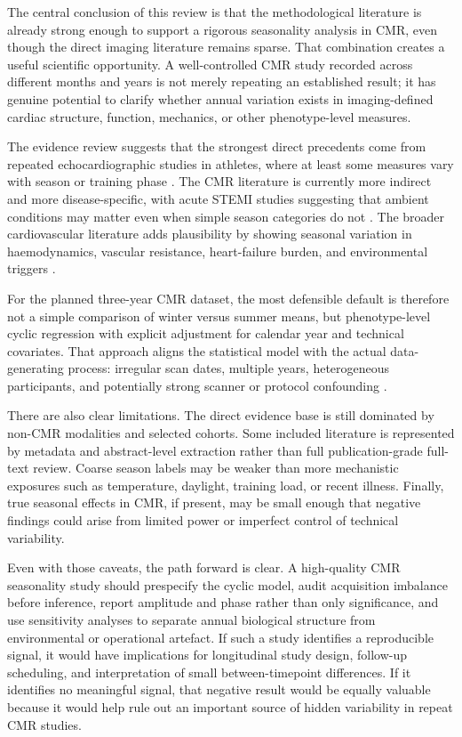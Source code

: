The central conclusion of this review is that the methodological literature is already strong enough to support a rigorous seasonality analysis in CMR, even though the direct imaging literature remains sparse. That combination creates a useful scientific opportunity. A well-controlled CMR study recorded across different months and years is not merely repeating an established result; it has genuine potential to clarify whether annual variation exists in imaging-defined cardiac structure, function, mechanics, or other phenotype-level measures.

The evidence review suggests that the strongest direct precedents come from repeated echocardiographic studies in athletes, where at least some measures vary with season or training phase \cite{Fagard1983,Crouse1992,Dernovoj2022,Forsythe2023}. The CMR literature is currently more indirect and more disease-specific, with acute STEMI studies suggesting that ambient conditions may matter even when simple season categories do not \cite{Park2019,Redfors2022}. The broader cardiovascular literature adds plausibility by showing seasonal variation in haemodynamics, vascular resistance, heart-failure burden, and environmental triggers \cite{Radke2010,Boulay1999,Gallerani2011,Mete2019}.

For the planned three-year CMR dataset, the most defensible default is therefore not a simple comparison of winter versus summer means, but phenotype-level cyclic regression with explicit adjustment for calendar year and technical covariates. That approach aligns the statistical model with the actual data-generating process: irregular scan dates, multiple years, heterogeneous participants, and potentially strong scanner or protocol confounding \cite{Stolwijk1999,Cornelissen2014,Wood2017}.

There are also clear limitations. The direct evidence base is still dominated by non-CMR modalities and selected cohorts. Some included literature is represented by metadata and abstract-level extraction rather than full publication-grade full-text review. Coarse season labels may be weaker than more mechanistic exposures such as temperature, daylight, training load, or recent illness. Finally, true seasonal effects in CMR, if present, may be small enough that negative findings could arise from limited power or imperfect control of technical variability.

Even with those caveats, the path forward is clear. A high-quality CMR seasonality study should prespecify the cyclic model, audit acquisition imbalance before inference, report amplitude and phase rather than only significance, and use sensitivity analyses to separate annual biological structure from environmental or operational artefact. If such a study identifies a reproducible signal, it would have implications for longitudinal study design, follow-up scheduling, and interpretation of small between-timepoint differences. If it identifies no meaningful signal, that negative result would be equally valuable because it would help rule out an important source of hidden variability in repeat CMR studies.
